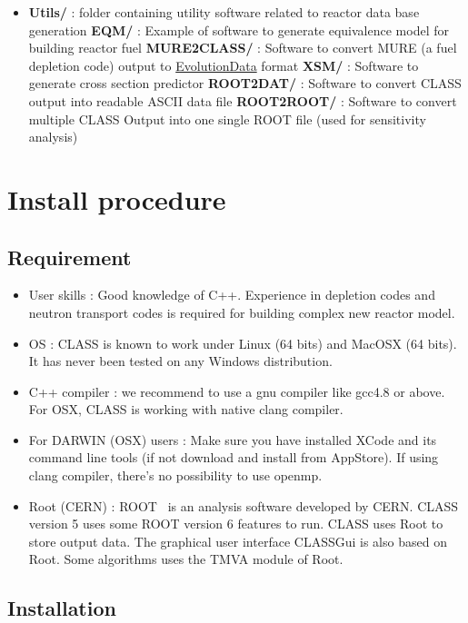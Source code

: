 \begin{itemize}
\item \textbf{Utils/} : folder containing utility software related to reactor data base generation
\subitem \textbf{EQM/} : Example of software to generate equivalence model for building reactor fuel
\subitem \textbf{MURE2CLASS/} : Software to convert MURE (a fuel depletion code)  output to \hyperref[sec:EvolutionData]{EvolutionData} format
\subitem \textbf{XSM/} : Software to generate cross section predictor
\subitem \textbf{ROOT2DAT/} : Software to convert CLASS output into readable ASCII data file
\subitem \textbf{ROOT2ROOT/} : Software to convert multiple CLASS Output into one single ROOT file (used for sensitivity analysis)
 
\end{itemize}

\chapter{Install procedure}

\section{Requirement}

\begin{itemize}
\item User skills : Good knowledge of C++. Experience in depletion codes and neutron transport codes is required for building complex new reactor model.
\item OS : CLASS is known to work under Linux (64  bits) and MacOSX (64 bits). It  has never been tested on any Windows distribution.
\item C++ compiler :  we recommend to use a gnu compiler like gcc4.8 or above. For OSX, CLASS is working with native clang compiler.
\item For DARWIN (OSX) users : 
Make sure you have installed XCode and its command line tools (if not download and install from AppStore). If using clang compiler, there's no possibility to use openmp. 
\item Root (CERN) :  
ROOT~\cite{Brun_1997} is an analysis software developed by CERN. CLASS version 5 uses some ROOT version 6 features to run. CLASS uses Root to store output data. The graphical user interface CLASSGui is also based on Root. Some algorithms uses the TMVA module of Root. 
\end{itemize}

\section{Installation}

